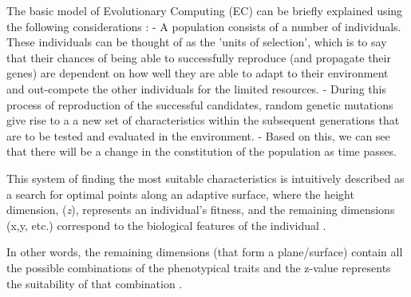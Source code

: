 The basic model of Evolutionary Computing (EC) can be briefly explained using the following considerations \cite{EibenSmith2003}:
- A population consists of a number of individuals. These individuals can be thought of as the 'units of selection', which is to say that their chances of being able to successfully reproduce (and propagate their genes) are dependent on how well they are able to adapt to their environment and out-compete the other individuals for the limited resources.
- During this process of reproduction of the successful candidates, random genetic mutations give rise to a a new set of characteristics within the subsequent generations that are to be tested and evaluated in the environment.
- Based on this, we can see that there will be a change in the constitution of the population as time passes.



This system of finding the most suitable characteristics is intuitively described as a search for optimal points along an adaptive surface, where the height dimension, (\textit{z}), represents an individual's fitness, and the remaining dimensions (x,y, etc.) correspond to the biological features of the individual \cite{EibenSmith2003}. 

In other words, the remaining dimensions (that form a plane/surface) contain all the possible combinations of the phenotypical traits and the z-value represents the suitability of that combination \cite{EibenSmith2003}.



